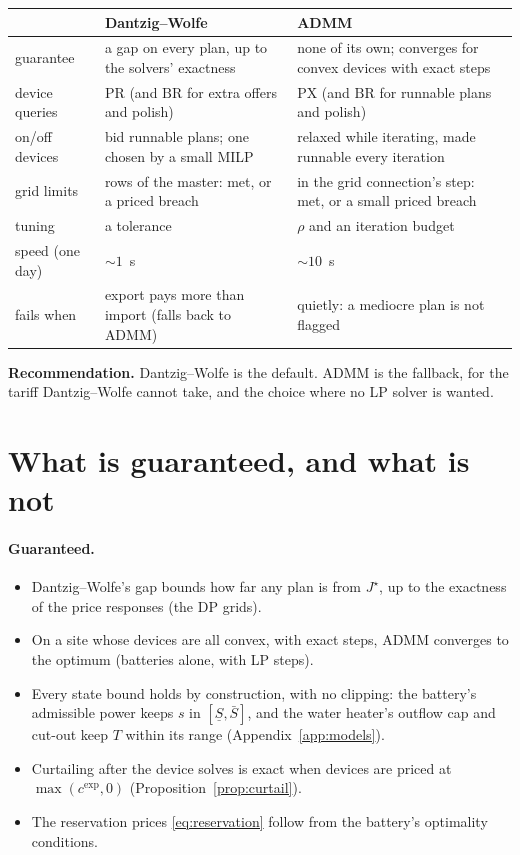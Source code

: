 \documentclass[11pt,a4paper]{article}
\newcommand{\cexp}{c^{\mathrm{exp}}}
\newcommand{\PR}{\mathrm{PR}}
\newcommand{\PX}{\mathrm{PX}}
\newcommand{\BR}{\mathrm{BR}}
\begin{document}
\begin{center}
\small
\begin{tabular}{@{}L{0.18\textwidth}L{0.39\textwidth}L{0.37\textwidth}@{}}
\toprule
& Dantzig--Wolfe & ADMM \\
\midrule
guarantee & a gap on every plan, up to the solvers' exactness & none of its own; converges for convex devices with exact steps \\
device queries & $\PR$ (and $\BR$ for extra offers and polish) & $\PX$ (and $\BR$ for runnable plans and polish) \\
on/off devices & bid runnable plans; one chosen by a small MILP & relaxed while iterating, made runnable every iteration \\
grid limits & rows of the master: met, or a priced breach & in the grid connection's step: met, or a small priced breach \\
tuning & a tolerance & $\rho$ and an iteration budget \\
speed (one day) & $\sim 1$~s & $\sim 10$~s \\
fails when & export pays more than import (falls back to ADMM) & quietly: a mediocre plan is not flagged \\
\bottomrule
\end{tabular}
\end{center}

\noindent\textbf{Recommendation.} Dantzig--Wolfe is the default. ADMM is the
fallback, for the tariff Dantzig--Wolfe cannot take, and the choice where no LP
solver is wanted.

\section{What is guaranteed, and what is not}
\label{sec:limits}

\paragraph{Guaranteed.}
\begin{itemize}[leftmargin=*,itemsep=1pt]
\item Dantzig--Wolfe's gap bounds how far any plan is from $J^\star$, up to the
  exactness of the price responses (the DP grids).
\item On a site whose devices are all convex, with exact steps, ADMM converges to
  the optimum (batteries alone, with LP steps).
\item Every state bound holds by construction, with no clipping: the battery's
  admissible power keeps $s$ in $[\underline S, \bar S]$, and the water heater's
  outflow cap and cut-out keep $T$ within its range (Appendix~\ref{app:models}).
\item Curtailing after the device solves is exact when devices are priced at
  $\max(\cexp, 0)$ (Proposition~\ref{prop:curtail}).
\item The reservation prices \eqref{eq:reservation} follow from the battery's
  optimality conditions.
\end{itemize}
\end{document}
